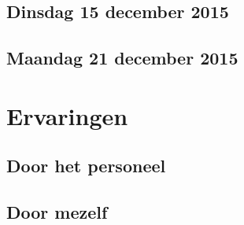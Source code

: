 \documentclass[a4paper,12pt]{article}
\begin{document}
\subsection{Dinsdag 15 december 2015}

\subsection{Maandag 21 december 2015}

\section{Ervaringen}

\subsection{Door het personeel}

\subsection{Door mezelf}
\end{document}
